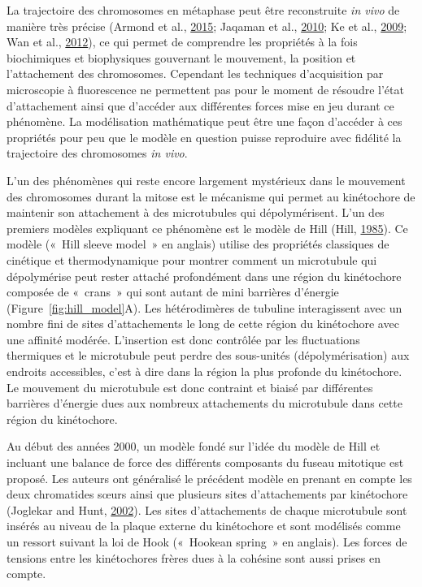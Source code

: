 \documentclass[12pt,a4paper,twoside,openright]{book}
\begin{document}
\label{sec:force-gen}

La trajectoire des chromosomes en métaphase peut être reconstruite
\emph{in vivo} de manière très précise (Armond et al.,
\protect\hyperlink{ref-Armond2015}{2015}; Jaqaman et al.,
\protect\hyperlink{ref-Jaqaman2010}{2010}; Ke et al.,
\protect\hyperlink{ref-Ke2009}{2009}; Wan et al.,
\protect\hyperlink{ref-Wan2012}{2012}), ce qui permet de comprendre les
propriétés à la fois biochimiques et biophysiques gouvernant le
mouvement, la position et l'attachement des chromosomes. Cependant les
techniques d'acquisition par microscopie à fluorescence ne permettent
pas pour le moment de résoudre l'état d'attachement ainsi que d'accéder
aux différentes forces mise en jeu durant ce phénomène. La modélisation
mathématique peut être une façon d'accéder à ces propriétés pour peu que
le modèle en question puisse reproduire avec fidélité la trajectoire des
chromosomes \emph{in vivo}.

L'un des phénomènes qui reste encore largement mystérieux dans le
mouvement des chromosomes durant la mitose est le mécanisme qui permet
au kinétochore de maintenir son attachement à des microtubules qui
dépolymérisent. L'un des premiers modèles expliquant ce phénomène est le
modèle de Hill (Hill, \protect\hyperlink{ref-Hill1985}{1985}). Ce modèle
(«~Hill sleeve model~» en anglais) utilise des propriétés classiques de
cinétique et thermodynamique pour montrer comment un microtubule qui
dépolymérise peut rester attaché profondément dans une région du
kinétochore composée de «~crans~» qui sont autant de mini barrières
d'énergie (Figure~\ref{fig:hill_model}A). Les hétérodimères de tubuline
interagissent avec un nombre fini de sites d'attachements le long de
cette région du kinétochore avec une affinité modérée. L'insertion est
donc contrôlée par les fluctuations thermiques et le microtubule peut
perdre des sous-unités (dépolymérisation) aux endroits accessibles,
c'est à dire dans la région la plus profonde du kinétochore. Le
mouvement du microtubule est donc contraint et biaisé par différentes
barrières d'énergie dues aux nombreux attachements du microtubule dans
cette région du kinétochore.

Au début des années 2000, un modèle fondé sur l'idée du modèle de Hill
et incluant une balance de force des différents composants du fuseau
mitotique est proposé. Les auteurs ont généralisé le précédent modèle en
prenant en compte les deux chromatides sœurs ainsi que plusieurs sites
d'attachements par kinétochore (Joglekar and Hunt,
\protect\hyperlink{ref-Joglekar2002}{2002}). Les sites d'attachements de
chaque microtubule sont insérés au niveau de la plaque externe du
kinétochore et sont modélisés comme un ressort suivant la loi de Hook
(«~Hookean spring~» en anglais). Les forces de tensions entre les
kinétochores frères dues à la cohésine sont aussi prises en compte.
\end{document}

